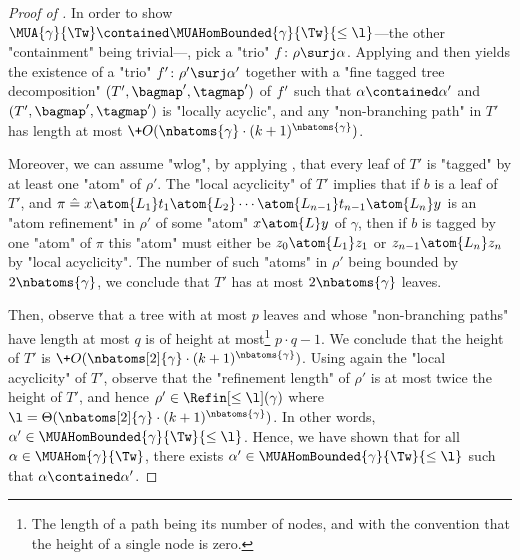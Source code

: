 \begin{proof}[Proof of ]
    In order to show $\MUA{\gamma}{\Tw} \contained \MUAHomBounded{\gamma}{\Tw}{\leq\l}$---the other
    "containment" being trivial---, pick a "trio" $\fun\colon \rho \surj \alpha$.
    Applying  and then 
    yields the existence of a "trio" $\fun'\colon \rho' \surj \alpha'$ together
    with a "fine tagged tree decomposition" $(T', \bagmap', \tagmap')$ of $f'$
    such that $\alpha \contained \alpha'$ and $(T', \bagmap', \tagmap')$ is "locally acyclic",
    and any "non-branching path" in $T'$ has length at most
    $\+O(\nbatoms{\gamma}\cdot (k+1)^{\nbatoms{\gamma}})$.

    Moreover, we can assume "wlog", by applying ,
    that every leaf of $T'$ is "tagged" by at least one "atom" of $\rho'$.
    The "local acyclicity" of $T'$ implies that if $b$ is a leaf of $T'$,
    and
    $
        \pi \defeq x \atom{L_1} t_1 \atom{L_2} \cdots \atom{L_{n-1}} t_{n-1} \atom{L_n} y
    $
    is an "atom refinement" in $\rho'$ of some "atom" $x \atom{L} y$ of $\gamma$,
    then if $b$ is tagged by one "atom" of $\pi$ this "atom" must either be $z_0 \atom{L_1} z_1$
    or $z_{n-1} \atom{L_n} z_n$ by "local acyclicity".
    The number of such "atoms" in $\rho'$ being bounded by $2\nbatoms{\gamma}$, we conclude that
    $T'$ has at most $2\nbatoms{\gamma}$ leaves.

    Then, observe that a tree with at most $p$ leaves and whose "non-branching paths"
    have length at most $q$ is of height at most\footnote{The length of a path being its number of nodes,
    and with the convention that the height of a single node is zero.} $p\cdot q - 1$. We
    conclude that the height of $T'$ is 
    $\+O(\nbatoms[2]{\gamma}\cdot (k+1)^{\nbatoms{\gamma}})$.
    Using again the "local acyclicity" of $T'$, observe that the "refinement length" of $\rho'$
    is at most twice the height of $T'$, and hence $\rho' \in \Refin[\leq \l](\gamma)$
    where $\l = \Theta(\nbatoms[2]{\gamma}\cdot (k+1)^{\nbatoms{\gamma}})$.
    In other words, $\alpha' \in \MUAHomBounded{\gamma}{\Tw}{\leq\l}$.
    Hence, we have shown that for all $\alpha \in \MUAHom{\gamma}{\Tw}$,
    there exists $\alpha' \in \MUAHomBounded{\gamma}{\Tw}{\leq\l}$ such that $\alpha \contained \alpha'$.
\end{proof}

